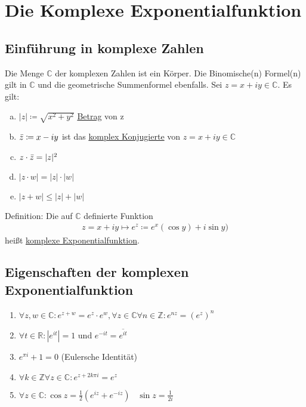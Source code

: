 \documentclass{article}
\begin{document}
\section{Die Komplexe Exponentialfunktion}

\subsection{Einführung in komplexe Zahlen}
Die Menge $\mathbb{C}$ der komplexen Zahlen ist ein Körper. Die Binomische(n) Formel(n) gilt in $\mathbb{C}$ und die geometrische Summenformel
ebenfalls. Sei $z=x+iy \in \mathbb{C}$. Es gilt:
\begin{enumerate} [a)]
    \item $|z| \coloneqq \sqrt{x^2 + y^2}$ \underline{Betrag} von z
    \item $\Bar{z} \coloneqq x-iy$ ist das \underline{komplex Konjugierte} von $z=x+iy \in \mathbb{C}$
    \item $z \cdot \Bar{z} = |z|^2$
    \item $|z \cdot w| = |z| \cdot |w|$
    \item $|z+w| \leq |z| + |w|$
\end{enumerate}

Definition: Die auf $\mathbb{C}$ definierte Funktion
\begin{align*}
    z=x+iy \mapsto e^z \coloneqq e^x (\cos y) + i\sin y)
\end{align*}
heißt \underline{komplexe Exponentialfunktion}.

\subsection{Eigenschaften der komplexen Exponentialfunktion}
\begin{enumerate}
    \item $\forall z,w \in \mathbb{C}: e^{z+w} = e^z \cdot e^w, \forall z \in \mathbb{C} \forall n \in \mathbb{Z}: e^{nz}=(e^z)^n$
    \item $\forall t \in \mathbb{R}: |e^{it}| = 1$ und $e^{-it} = \overline{e^{it}}$
    \item $e^{\pi i} + 1 = 0$ (Eulersche Identität)
    \item $\forall k \in \mathbb{Z} \forall z \in \mathbb{C}: e^{z+2k\pi i} = e^z$
    \item $\forall z \in \mathbb{C}: \cos z = \frac{1}{2} (e^{iz} + e^{-iz})$ \, $\sin z = \frac{1}{2i}$
\end{enumerate}
\end{document}
